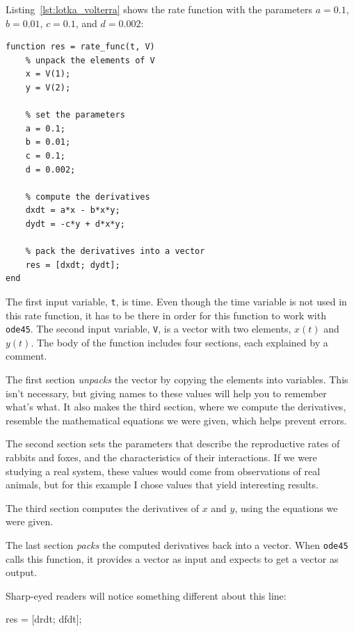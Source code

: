 Listing~\ref{lst:lotka_volterra} shows the rate function
with the parameters $a = 0.1$, $b = 0.01$, $c = 0.1$, and $d = 0.002$:

\begin{lstlisting}[caption={A rate function for Lotka-Volterra}, label={lst:lotka_volterra}]
function res = rate_func(t, V)
    % unpack the elements of V
    x = V(1);
    y = V(2);

    % set the parameters
    a = 0.1;
    b = 0.01;
    c = 0.1;
    d = 0.002;

    % compute the derivatives
    dxdt = a*x - b*x*y;
    dydt = -c*y + d*x*y;

    % pack the derivatives into a vector
    res = [dxdt; dydt];
end
\end{lstlisting}

The first input variable, \lstinline{t}, is time.
Even though the time variable is not used in this rate function,
it has to be there in order for this function to work with \lstinline{ode45}.
The second input variable, \lstinline{V}, is a vector with two elements,
$x(t)$ and $y(t)$.
The body of the function includes four sections, each explained by a comment.

The first section \emph{unpacks} the vector by copying the elements
into variables.  This isn't necessary, but giving names to
these values will help you to remember what's what.  It also makes the third
section, where we compute the derivatives, resemble the mathematical
equations we were given, which helps prevent errors.


The second section sets the parameters that describe the
reproductive rates of rabbits and foxes, and the characteristics of
their interactions.  If we were studying a real system, these values
would come from observations of real animals, but for this example
I chose values that yield interesting results.


The third section computes the derivatives of $x$ and $y$, using the equations
we were given.

The last section \emph{packs} the computed derivatives back into a
vector.  When \lstinline{ode45} calls this function, it provides a vector
as input and expects to get a vector as output.

Sharp-eyed readers will notice something different about this line:

\begin{code}
    res = [drdt; dfdt];
\end{code}

